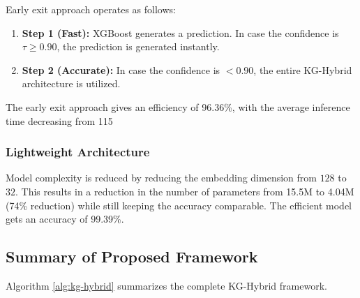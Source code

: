 \documentclass[journal]{IEEEtran}
\begin{document}
Early exit approach operates as follows:

\begin{enumerate}
    \item \textbf{Step 1 (Fast):} XGBoost generates a prediction. In case the confidence is $\tau \geq 0.90$, the prediction is generated instantly.
    \item \textbf{Step 2 (Accurate):} In case the confidence is $< 0.90$, the entire KG-Hybrid architecture is utilized.
\end{enumerate}

The early exit approach gives an efficiency of 96.36\%, with the average inference time decreasing from 115

\subsubsection{Lightweight Architecture}

Model complexity is reduced by reducing the embedding dimension from $128$ to $32$. This results in a reduction in the number of parameters from 15.5M to 4.04M (74\% reduction) while still keeping the accuracy comparable. The efficient model gets an accuracy of 99.39\%.

\subsection{Summary of Proposed Framework}

Algorithm \ref{alg:kg-hybrid} summarizes the complete KG-Hybrid framework.
\end{document}
